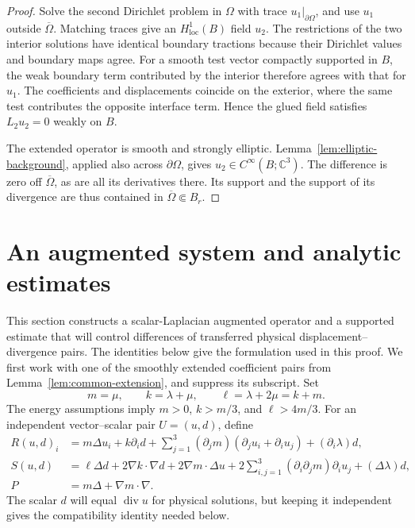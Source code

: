 \documentclass[11pt]{article}
\newcommand{\C}{\mathbb C}
\DeclareMathOperator{\diverg}{div}
\theoremstyle{remark}
\numberwithin{equation}{section}
\begin{document}
\begin{proof}
Solve the second Dirichlet problem in $\Omega$ with trace
$u_1|_{\partial\Omega}$, and use $u_1$ outside $\overline\Omega$.
Matching traces give an $H^1_{\mathrm{loc}}(B)$ field $u_2$.
The restrictions of the two interior solutions have identical boundary
tractions because their Dirichlet values and boundary maps agree.
For a smooth test vector compactly supported in $B$, the weak boundary
term contributed by the interior therefore agrees with that for $u_1$.
The coefficients and displacements coincide on the exterior, where the
same test contributes the opposite interface term. Hence the glued
field satisfies $L_2u_2=0$ weakly on $B$.

The extended operator is smooth and strongly elliptic. Lemma~\ref{lem:elliptic-background}, applied also across $\partial\Omega$, gives
$u_2\in C^\infty(B;\C^3)$. The difference is zero off
$\overline\Omega$, as are all its derivatives there. Its support and
the support of its divergence are thus contained in
$\overline\Omega\Subset B_r$.
\end{proof}

\section{An augmented system and analytic estimates}
\label{sec:analytic-estimates}

This section constructs a scalar-Laplacian augmented operator and a
supported estimate that will control differences of transferred physical
displacement--divergence pairs.
The identities below give the formulation used in this proof.
We first work with one of the smoothly extended coefficient pairs from
Lemma~\ref{lem:common-extension}, and suppress its subscript. Set
\[
 m=\mu,\qquad k=\lambda+\mu,\qquad \ell=\lambda+2\mu=k+m.
\]
The energy assumptions imply $m>0$, $k>m/3$, and $\ell>4m/3$.
For an independent vector--scalar pair $U=(u,d)$, define
\begin{equation}
\label{eq:augmented-operators}
\begin{aligned}
 R(u,d)_i
  & =m\Delta u_i+k\partial_i d
   +\sum_{j=1}^3(\partial_jm)(\partial_ju_i+\partial_iu_j)
   +(\partial_i\lambda)d,\\
 S(u,d)
  & =\ell\Delta d+2\nabla k\cdot\nabla d
   +2\nabla m\cdot\Delta u
   +2\sum_{i,j=1}^3(\partial_i\partial_jm)\partial_iu_j
   +(\Delta\lambda)d,\\
 P&=m\Delta+\nabla m\cdot\nabla.
\end{aligned}
\end{equation}
The scalar $d$ will equal $\diverg u$ for physical solutions, but keeping
it independent gives the compatibility identity needed below.
\end{document}
